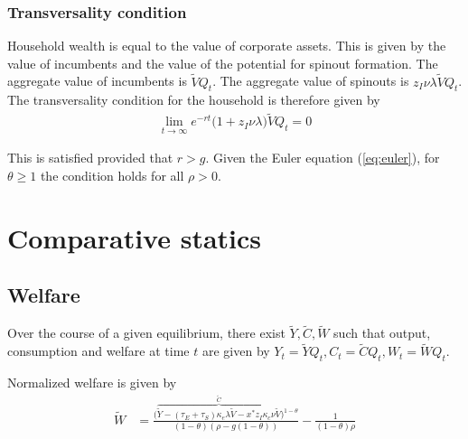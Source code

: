 \documentclass[12pt,english]{article}
\theoremstyle{remark}
\begin{document}
\subsubsection{Transversality condition}

Household wealth is equal to the value of corporate assets. This is given by the value of incumbents and the value of the potential for spinout formation. The aggregate value of incumbents is $\tilde{V}Q_t$. The aggregate value of spinouts is $z_I \nu \lambda \tilde{V} Q_t$. The transversality condition for the household is therefore given by 
\begin{align}
	\lim_{t \to \infty} e^{-rt} \big(1 + z_I \nu \lambda \big)\tilde{V} Q_t = 0
\end{align}

This is satisfied provided that $r > g$. Given the Euler equation (\ref{eq:euler}), for $\theta \ge 1$ the condition holds for all $\rho > 0$. 

\section{Comparative statics}

\subsection{Welfare}

Over the course of a given equilibrium, there exist $\tilde{Y},\tilde{C},\tilde{W}$ such that output, consumption and welfare at time $t$ are given by $Y_t = \tilde{Y} Q_t, C_t = \tilde{C} Q_t, W_t = \tilde{W} Q_t$. 

Normalized welfare is given by 
\begin{align}
\tilde{W} &= \frac{\big(\overbrace{\tilde{Y} - (\tau_E + \tau_S) \kappa_{e} \lambda \tilde{V} - x^* z_I \kappa_c \nu \tilde{V}}^{\tilde{C}}\big)^{1-\theta}}{(1-\theta)(\rho - g(1-\theta))} - \frac{1}{(1-\theta)\rho}  \label{eq:agg_welfare}
\end{align}
\end{document}
